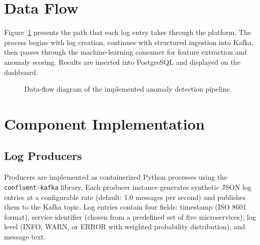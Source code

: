 \documentclass[12pt,a4paper]{report}
\begin{document}
\section{Data Flow}

Figure~\ref{fig:dataflow} presents the path that each log entry takes through the platform. The process begins with log creation, continues with structured ingestion into Kafka, then passes through the machine-learning consumer for feature extraction and anomaly scoring. Results are inserted into PostgreSQL and displayed on the dashboard.

\begin{figure}[htbp]
\centering
{}
\caption{Data-flow diagram of the implemented anomaly detection pipeline.}
\label{fig:dataflow}
\end{figure}

\section{Component Implementation}

\subsection{Log Producers}

Producers are implemented as containerized Python processes using the \texttt{confluent-kafka} library. Each producer instance generates synthetic JSON log entries at a configurable rate (default: 1.0 messages per second) and publishes them to the Kafka topic. Log entries contain four fields: timestamp (ISO 8601 format), service identifier (chosen from a predefined set of five microservices), log level (INFO, WARN, or ERROR with weighted probability distribution), and message text.
\end{document}
